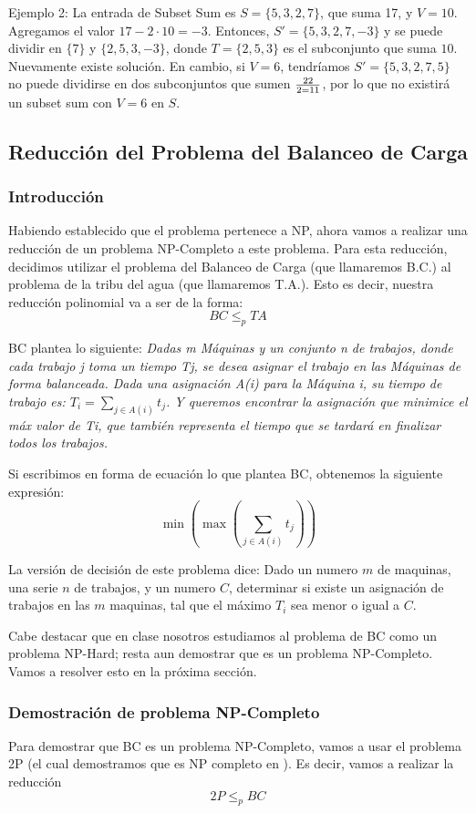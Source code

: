 \documentclass{article}
\begin{document}
Ejemplo 2: La entrada de Subset Sum es \( S = \{5, 3, 2, 7\} \), que suma 17, y \( V = 10 \). Agregamos el valor $17 - 2 \cdot 10 = -3$. Entonces, \( S' = \{5, 3, 2, 7, -3\} \) y se puede dividir en  \( \{7\} \) y \( \{2, 5, 3, -3\} \), donde \( T = \{2, 5, 3\} \) es el subconjunto que suma \( 10 \). Nuevamente existe solución. En cambio, si $V = 6$, tendríamos \( S' = \{5, 3, 2, 7, 5\} \) no puede dividirse en dos subconjuntos que sumen $22 \over 2 = 11$, por lo que no existirá un subset sum con $V = 6$ en $S$.

\subsection{Reducción del Problema del Balanceo de Carga}
\subsubsection{Introducción}
Habiendo establecido que el problema pertenece a NP, ahora vamos a realizar una reducción de un problema NP-Completo a este problema.
Para esta reducción, decidimos utilizar el problema del Balanceo de Carga (que llamaremos B.C.) al problema de la tribu del agua (que llamaremos T.A.). Esto es decir, nuestra reducción polinomial va a ser de la forma:
$$
BC \leq_p TA
$$

BC plantea lo siguiente: 
\textit{Dadas m Máquinas y un conjunto n de trabajos, donde cada trabajo j toma un tiempo Tj, se desea asignar el trabajo en las Máquinas de forma balanceada. Dada una asignación A(i) para la Máquina i, su tiempo de trabajo es: $T_{i} =\displaystyle{\sum_{j \in A(i)} t_j}$. Y queremos encontrar la asignación que minimice el máx valor de Ti, que también representa el tiempo que se tardará en finalizar todos los trabajos.}

Si escribimos en forma de ecuación lo que plantea BC, obtenemos la siguiente expresión:
$$
\min( \max (\displaystyle{\sum_{j \in A(i)} t_j}))
$$

La versión de decisión de este problema dice: Dado un numero $m$ de maquinas, una serie $n$ de trabajos, y un numero $C$, determinar si existe un asignación de trabajos en las $m$ maquinas, tal que el máximo $T_i$ sea menor o igual a $C$.

Cabe destacar que en clase nosotros estudiamos al problema de BC como un problema NP-Hard; resta aun demostrar que es un problema NP-Completo. Vamos a resolver esto en la próxima sección.

\subsubsection{Demostración de problema NP-Completo}
\label{sec:np-completo-bc}
Para demostrar que BC es un problema NP-Completo, vamos a usar el problema 2P (el cual demostramos que es NP completo en ). Es decir, vamos a realizar la reducción
$$
2P \leq_p BC
$$
\end{document}
